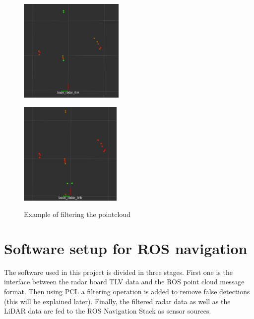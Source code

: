 \begin{figure}[h] 
    \begin{minipage}[b]{.49\linewidth}
        \includegraphics[height=5cm,width=\linewidth]{imgs/chapter4/filt.png}
        \label{fig:fft}
    \end{minipage}
    \begin{minipage}[b]{.49\linewidth}
        \includegraphics[height=5cm,width=\linewidth]{imgs/chapter4/notfilt.png}
        \subcaption{Filtered pointcloud by intensity]}
        \label{fig:fft2}
    \end{minipage}
    \caption{Example of filtering the pointcloud}
    \label{fig:distance determination}
\end{figure}


\section{Software setup for ROS navigation}
The software used in this project is divided in three stages. First one is the interface between the radar board TLV data and the ROS point cloud message format. Then using \ac{PCL} a filtering operation is added to remove false detections (this will be explained later). Finally, the filtered radar data as well as the \ac{LiDAR} data are fed to the ROS Navigation Stack as sensor sources. 

